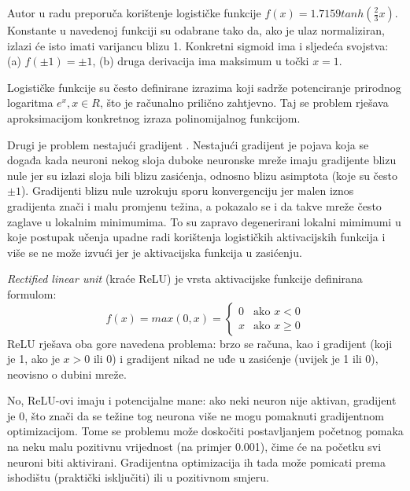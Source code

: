 \documentclass[times, utf8, diplomski, numeric]{fer}
\begin{document}
Autor u radu \cite{lecun-98b} preporuča korištenje logističke funkcije $f(x) = 1.7159 tanh(\frac{2}{3} x)$. Konstante u navedenoj funkciji su odabrane tako da, ako je ulaz normaliziran, izlazi će isto imati varijancu blizu 1. Konkretni sigmoid ima i sljedeća svojstva: (a) $f(\pm 1) = \pm 1$, (b) druga derivacija ima maksimum u točki $x = 1$.

Logističke funkcije su često definirane izrazima koji sadrže potenciranje prirodnog logaritma $e^{x}, x \in R$, što je računalno prilično zahtjevno. Taj se problem rješava aproksimacijom konkretnog izraza polinomijalnog funkcijom.

Drugi je problem nestajući gradijent . Nestajući gradijent je pojava koja se događa kada neuroni nekog sloja duboke neuronske mreže imaju gradijente blizu nule jer su izlazi sloja bili blizu zasićenja, odnosno blizu asimptota (koje su često $\pm 1$). Gradijenti blizu nule uzrokuju sporu konvergenciju jer malen iznos gradijenta znači i malu promjenu težina, a pokazalo se i da takve mreže često zaglave u lokalnim minimumima. To su zapravo degenerirani lokalni mimimumi u koje postupak učenja upadne radi korištenja logističkih aktivacijskih funkcija i više se ne može izvući jer je aktivacijska funkcija u zasićenju.

\emph{Rectified linear unit} (kraće ReLU) je vrsta aktivacijske funkcije definirana formulom:
\begin{equation}
f(x) = max(0, x) =
    \left\{
        \begin{array}{ll}
            0  & \mbox{ako } x < 0 \\
            x  & \mbox{ako } x \geq 0
        \end{array}
    \right.
\end{equation}
ReLU rješava oba gore navedena problema: brzo se računa, kao i gradijent (koji je 1, ako je $x > 0$ ili 0) i gradijent nikad ne uđe u zasićenje (uvijek je 1 ili 0), neovisno o dubini mreže.

No, ReLU-ovi imaju i potencijalne mane: ako neki neuron nije aktivan, gradijent je 0, što znači da se težine tog neurona više ne mogu pomaknuti gradijentnom optimizacijom. Tome se problemu može doskočiti postavljanjem početnog pomaka  na neku malu pozitivnu vrijednost (na primjer 0.001), čime će na početku svi neuroni biti aktivirani. Gradijentna optimizacija ih tada može pomicati prema ishodištu (praktički isključiti) ili u pozitivnom smjeru. \cite{maas2013rectifier}
\end{document}
